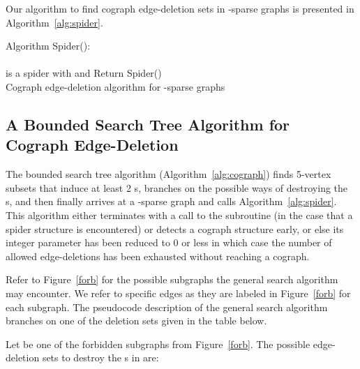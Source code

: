 \documentclass{llncs}
\begin{document}
Our algorithm to find cograph edge-deletion sets in -sparse graphs is presented in Algorithm~\ref{alg:spider}.

\begin{algorithm}[H]
\SetAlgoLined Algorithm {\sc Spider()}:\\
\ \\
 is a spider with  and \;
Return  {\sc Spider()}\;
\ \\
\caption{Cograph edge-deletion algorithm for -sparse graphs}
\label{alg:spider}
\end{algorithm}

\subsection{A Bounded Search Tree Algorithm for Cograph Edge-Deletion}

The bounded search tree algorithm (Algorithm~\ref{alg:cograph}) finds 5-vertex subsets that induce at least 2 s, branches on the possible ways of destroying the s, and then finally arrives at a -sparse graph and calls Algorithm~\ref{alg:spider}. This algorithm either terminates with a call to the subroutine (in the case that a spider structure is encountered) or detects a cograph structure early, or else its integer parameter  has been reduced to 0 or less in which case the number of allowed edge-deletions has been exhausted without reaching a cograph.

Refer to Figure~\ref{forb} for the possible subgraphs the general search algorithm may encounter. We refer to specific edges as they are labeled in Figure~\ref{forb} for each subgraph. The pseudocode description of the general search algorithm branches on one of the deletion sets given in the table below.

Let  be one of the forbidden subgraphs from Figure~\ref{forb}. The possible edge-deletion sets to destroy the s in  are:


\ \\
\end{document}
